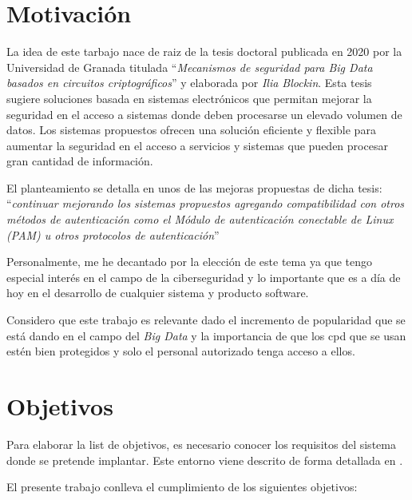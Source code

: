 \section{Motivación}
\label{sec:motivacion}

La idea de este tarbajo nace de raiz de la tesis doctoral \cite{tesisIliaBlockin} publicada en 2020 por la Universidad de Granada
titulada ``\textit{Mecanismos de seguridad para Big Data basados en circuitos criptográficos}'' y elaborada por \textit{Ilia 
Blockin}. Esta tesis sugiere soluciones basada en sistemas electrónicos que permitan mejorar la seguridad en el acceso a sistemas 
donde deben procesarse un elevado volumen de datos. Los sistemas propuestos ofrecen una solución eficiente y flexible para 
aumentar la seguridad en el acceso a servicios y sistemas que pueden procesar gran cantidad de información. 

El planteamiento se detalla en unos de las mejoras propuestas de dicha tesis: ``\textit{continuar mejorando los sistemas propuestos 
agregando compatibilidad con otros métodos de autenticación como el Módulo de autenticación conectable de Linux (PAM) u otros 
protocolos de autenticación}'' 

Personalmente, me he decantado por la elección de este tema ya que tengo especial interés en el campo de la ciberseguridad y 
lo importante que es a día de hoy en el desarrollo de cualquier sistema y producto software.

Considero que este trabajo es relevante dado el incremento de popularidad que se está dando en el campo del \textit{Big Data} y 
la importancia de que los \acrfull{cpd} que se usan estén bien protegidos y solo el personal autorizado tenga acceso a ellos.

\section{Objetivos}

Para elaborar la list de objetivos, es necesario conocer los requisitos del sistema donde se pretende implantar. Este entorno
viene descrito de forma detallada en \cite{multipauthpaper}. 

El presente trabajo conlleva el cumplimiento de los siguientes objetivos:

